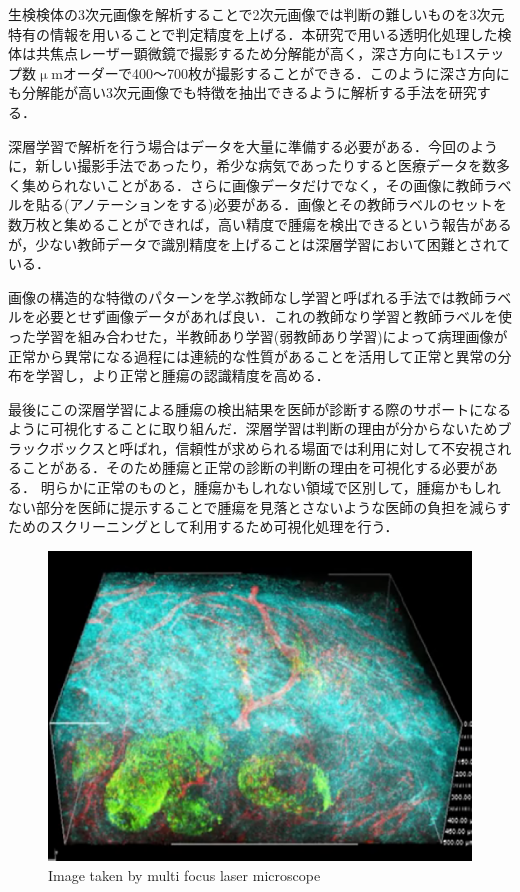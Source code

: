 生検検体の3次元画像を解析することで2次元画像では判断の難しいものを3次元特有の情報を用いることで判定精度を上げる．本研究で用いる透明化処理した検体は共焦点レーザー顕微鏡で撮影するため分解能が高く，深さ方向にも1ステップ数$\upmu$mオーダーで400〜700枚が撮影することができる．このように深さ方向にも分解能が高い3次元画像でも特徴を抽出できるように解析する手法を研究する．

深層学習で解析を行う場合はデータを大量に準備する必要がある．今回のように，新しい撮影手法であったり，希少な病気であったりすると医療データを数多く集められないことがある．さらに画像データだけでなく，その画像に教師ラベルを貼る(アノテーションをする)必要がある．画像とその教師ラベルのセットを数万枚と集めることができれば，高い精度で腫瘍を検出できるという報告があるが\cite{esteva2017dermatologist}，少ない教師データで識別精度を上げることは深層学習において困難とされている．

画像の構造的な特徴のパターンを学ぶ教師なし学習と呼ばれる手法では教師ラベルを必要とせず画像データがあれば良い．これの教師なり学習と教師ラベルを使った学習を組み合わせた，半教師あり学習(弱教師あり学習)によって病理画像が正常から異常になる過程には連続的な性質があることを活用して正常と異常の分布を学習し，より正常と腫瘍の認識精度を高める．

最後にこの深層学習による腫瘍の検出結果を医師が診断する際のサポートになるように可視化することに取り組んだ．深層学習は判断の理由が分からないためブラックボックスと呼ばれ，信頼性が求められる場面では利用に対して不安視されることがある．そのため腫瘍と正常の診断の判断の理由を可視化する必要がある．
明らかに正常のものと，腫瘍かもしれない領域で区別して，腫瘍かもしれない部分を医師に提示することで腫瘍を見落とさないような医師の負担を減らすためのスクリーニングとして利用するため可視化処理を行う．

\begin{figure}[H]
	\centering
	\includegraphics[width=0.7\linewidth]{fig/chapter1/microscope}
	\caption{Image taken by multi focus laser microscope}
	\label{fig:microscope}
\end{figure}
